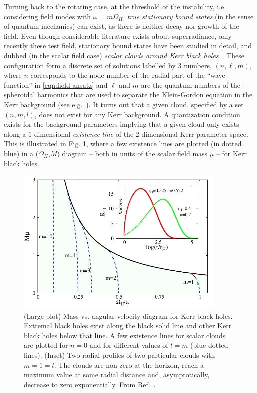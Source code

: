 Turning back to the rotating case, at the threshold of the instability, i.e. considering field modes with $\omega=m\Omega_H$, \textit{true stationary bound states} (in the sense of quantum mechanics) can exist, as there is neither decay nor growth of the field.
Even though considerable literature exists about superradiance, only recently these test field, stationary bound states have been studied in detail, and dubbed (in the scalar field case) \textit{scalar clouds around Kerr black holes}~\cite{Hod:2012px,Hod:2013zza,Herdeiro:2014goa}.
These configuration form a discrete set of solutions labelled by $3$ numbers, $(n,\ell,m)$, where $n$ corresponds to the node number of the radial part of the ``wave function'' in \eqref{eqn:field-ansatz} and $\ell$ and $m$ are the quantum numbers of the spheroidal harmonics that are used to separate the Klein-Gordon equation in the Kerr background (see e.g.~\cite{Brill:1972xj}).
It turns out that a given cloud, specified by a set $(n,m,l)$, does not exist for any Kerr background.
A quantization condition exists for the background parameters implying that a given cloud only exists along a $1$-dimensional \textit{existence line} of the $2$-dimensional Kerr parameter space.
This is illustrated in Fig. \ref{fig:clouds}, where a few existence lines are plotted (in dotted blue) in a ($\Omega_H$,$M$) diagram -- both in units of the scalar field mass $\mu$ -- for Kerr black holes. 
%
\begin{figure}[H]
  \begin{center}
  \includegraphics[height=2.78in]{Figs/unstable-OmegaH-M-clouds.pdf}
  \end{center}
  \caption{(Large plot) Mass vs. angular velocity diagram for Kerr black holes. Extremal black holes exist along the black solid line and other Kerr black holes below that line. A few existence lines for scalar clouds are plotted for $n=0$ and for different values of $l=m$ (blue dotted lines). (Inset) Two radial profiles of two particular clouds with $m=1=l$. The clouds are non-zero at the horizon, reach a maximum value at some radial distance and, asymptotically, decrease to zero exponentially. From Ref.~\cite{Herdeiro:2014goa}.}
  \label{fig:clouds}
\end{figure}

